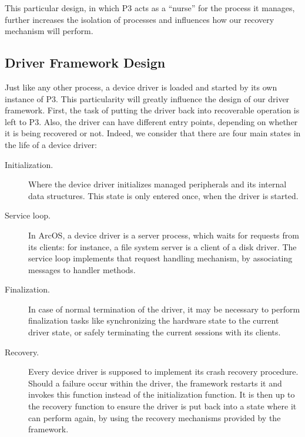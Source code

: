 \documentclass{acm_proc_article-sp}
\begin{document}
This particular design, in which P3 acts as a ``nurse'' for the process it manages, further increases the isolation of processes and influences how our recovery mechanism will perform.

\subsection{Driver Framework Design}
\label{sec:design-framework}
Just like any other process, a device driver is loaded and started by its own instance of P3. This particularity will greatly influence the design of our driver framework. First, the task of putting the driver back into recoverable operation is left to P3. Also, the driver can have different entry points, depending on whether it is being recovered or not. Indeed, we consider that there are four main states in the life of a device driver:

\begin{description}
\item[Initialization.]
Where the device driver initializes managed peripherals and its internal data structures. This state is only entered once, when the driver is started.

\item[Service loop.]
In ArcOS, a device driver is a server process, which waits for requests from its clients: for instance, a file system server is a client of a disk driver. The service loop implements that request handling mechanism, by associating messages to handler methods.%

\item[Finalization.]
In case of normal termination of the driver, it may be necessary to perform finalization tasks like synchronizing the hardware state to the current driver state, or safely terminating the current sessions with its clients.

\item[Recovery.]
Every device driver is supposed to implement its crash recovery procedure. Should a failure occur within the driver, the framework restarts it and invokes this function instead of the initialization function. It is then up to the recovery function to ensure the driver is put back into a state where it can perform again, by using the recovery mechanisms provided by the framework.%
\end{description}
\end{document}
